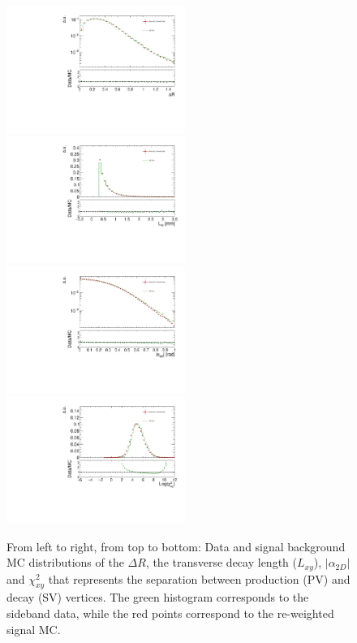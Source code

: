 \begin{figure}[!hbt]
\begin{center}
\hspace*{-0.6cm}
\includegraphics[width=0.52\textwidth]{figures/InternalNote_DataMCComparison/comp/DR_dt_mcXs.pdf}
\hspace*{-0.6cm}
\includegraphics[width=0.52\textwidth]{figures/InternalNote_DataMCComparison/comp/Lxy_dt_mcXs.pdf}\\
\hspace*{-0.6cm}
\includegraphics[width=0.52\textwidth]{figures/InternalNote_DataMCComparison/comp/fabs_a_2D__dt_mcXs.pdf}
\hspace*{-0.6cm}
\includegraphics[width=0.52\textwidth]{figures/InternalNote_DataMCComparison/comp/chi2_PVSV_log2D_dt_mcXs.pdf}
\caption{
From left to right, from top to bottom:
Data and signal background MC distributions of the $\Delta R$,
the transverse decay length ($L_{xy}$), $|\alpha_{2D}|$ and
$\chi^{2}_{xy}$ that represents the separation between production
(PV) and decay (SV) vertices.
The green histogram corresponds to the sideband data, while
the red points correspond to the re-weighted signal MC.}
\label{fig:maincompcont}
\end{center}
\end{figure}
  
